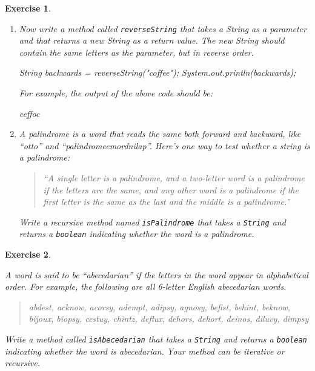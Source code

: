 \documentclass[12pt]{book}
\theoremstyle{exercise}
\newtheorem{exercise}{Exercise}[chapter]
\newcommand{\java}[1]{\verb"#1"}
\newcommand{\java}[1]{\lstinline{#1}} %
\begin{document}
\begin{exercise}
\begin{enumerate}
\item Now write a method called \java{reverseString} that takes a String as a parameter and that returns a new String as a return value.
The new String should contain the same letters as the parameter, but in reverse order.

\begin{code}
    String backwards = reverseString("coffee");
    System.out.println(backwards);
\end{code}

For example, the output of the above code should be:

\begin{stdout}
eeffoc
\end{stdout}

\item A palindrome is a word that reads the same both forward and backward, like ``otto'' and ``palindromeemordnilap''.
Here's one way to test whether a string is a palindrome:

\begin{quotation}
``A single letter is a palindrome, and a two-letter word is a palindrome if the letters are the same, and any other word is a palindrome if the first letter is the same as the last and the middle is a palindrome.''
\end{quotation}

Write a recursive method named \java{isPalindrome} that takes a \java{String} and returns a \java{boolean} indicating whether the word is a palindrome.

\end{enumerate}

\end{exercise}


\begin{exercise}
\label{abecedarian}

A word is said to be ``abecedarian'' if the letters in the word appear in alphabetical order.
For example, the following are all 6-letter English abecedarian words.

\begin{quote}
abdest, acknow, acorsy, adempt, adipsy, agnosy, befist, behint, %
beknow, bijoux, biopsy, cestuy, chintz, deflux, dehors, dehort, %
deinos, diluvy, dimpsy %
\end{quote}

Write a method called \java{isAbecedarian} that takes a \java{String} and returns a \java{boolean} indicating whether the word is abecedarian.
Your method can be iterative or recursive.

\end{exercise}
\end{document}
